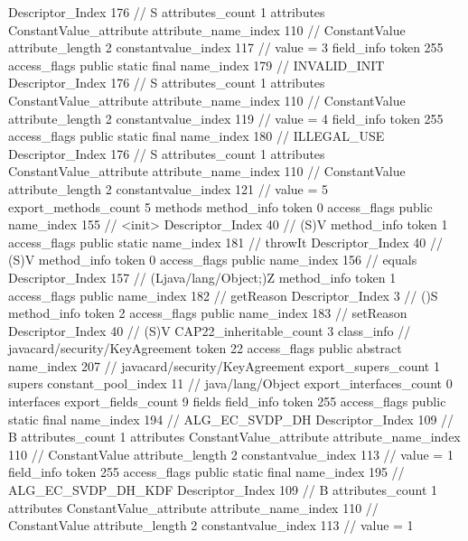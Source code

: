 {{{{{				Descriptor_Index	176		// S
				attributes_count	1
				attributes {
				ConstantValue_attribute {
					attribute_name_index	110		// ConstantValue
					attribute_length	2
					constantvalue_index	117		// value = 3
				}
				}
			}
			field_info {
				token	255
				access_flags	public static final
				name_index	179		// INVALID_INIT
				Descriptor_Index	176		// S
				attributes_count	1
				attributes {
				ConstantValue_attribute {
					attribute_name_index	110		// ConstantValue
					attribute_length	2
					constantvalue_index	119		// value = 4
				}
				}
			}
			field_info {
				token	255
				access_flags	public static final
				name_index	180		// ILLEGAL_USE
				Descriptor_Index	176		// S
				attributes_count	1
				attributes {
				ConstantValue_attribute {
					attribute_name_index	110		// ConstantValue
					attribute_length	2
					constantvalue_index	121		// value = 5
				}
				}
			}
			}
			export_methods_count	5
			methods {
				method_info {
					token	0
					access_flags	public
					name_index	155		// <init>
					Descriptor_Index	40		// (S)V
				}
				method_info {
					token	1
					access_flags	public static
					name_index	181		// throwIt
					Descriptor_Index	40		// (S)V
				}
				method_info {
					token	0
					access_flags	public
					name_index	156		// equals
					Descriptor_Index	157		// (Ljava/lang/Object;)Z
				}
				method_info {
					token	1
					access_flags	public
					name_index	182		// getReason
					Descriptor_Index	3		// ()S
				}
				method_info {
					token	2
					access_flags	public
					name_index	183		// setReason
					Descriptor_Index	40		// (S)V
				}
			}
			CAP22_inheritable_count	3
		}
		class_info {		// javacard/security/KeyAgreement
			token	22
			access_flags	public abstract
			name_index	207		// javacard/security/KeyAgreement
			export_supers_count	1
			supers {
				constant_pool_index	11		// java/lang/Object
			}
			export_interfaces_count	0
			interfaces {
			}
			export_fields_count	9
			fields {
			field_info {
				token	255
				access_flags	public static final
				name_index	194		// ALG_EC_SVDP_DH
				Descriptor_Index	109		// B
				attributes_count	1
				attributes {
				ConstantValue_attribute {
					attribute_name_index	110		// ConstantValue
					attribute_length	2
					constantvalue_index	113		// value = 1
				}
				}
			}
			field_info {
				token	255
				access_flags	public static final
				name_index	195		// ALG_EC_SVDP_DH_KDF
				Descriptor_Index	109		// B
				attributes_count	1
				attributes {
				ConstantValue_attribute {
					attribute_name_index	110		// ConstantValue
					attribute_length	2
					constantvalue_index	113		// value = 1
}}}}}}}

